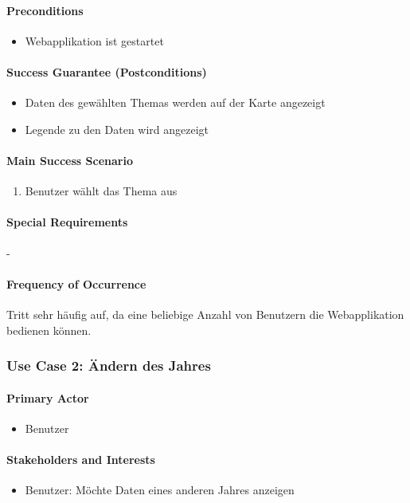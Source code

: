 \paragraph{Preconditions}
\begin{itemize}
\item Webapplikation ist gestartet
\end{itemize}

\paragraph{Success Guarantee (Postconditions)}
\begin{itemize}
\item Daten des gewählten Themas werden auf der Karte angezeigt
\item Legende zu den Daten wird angezeigt
\end{itemize}

\paragraph{Main Success Scenario}
\begin{enumerate}
\item Benutzer wählt das Thema aus
\end{enumerate}

\paragraph{Special Requirements}
-

\paragraph{Frequency of Occurrence}
Tritt sehr häufig auf, da eine beliebige Anzahl von Benutzern die Webapplikation bedienen können.

\subsubsection{Use Case 2: Ändern des Jahres}
\paragraph{Primary Actor}
\begin{itemize}
\item Benutzer
\end{itemize}

\paragraph{Stakeholders and Interests}
\begin{itemize}
\item Benutzer: Möchte Daten eines anderen Jahres anzeigen
\end{itemize}

